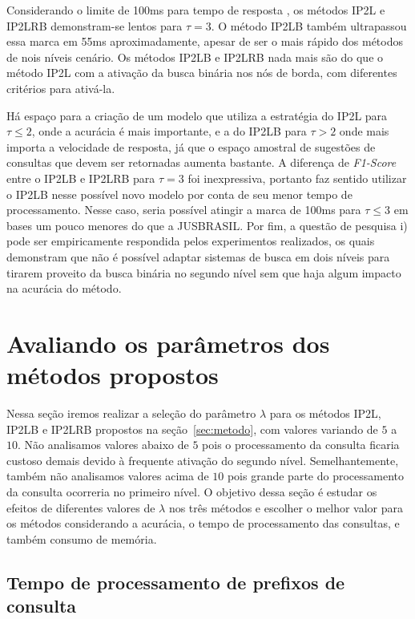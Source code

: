 Considerando o limite de 100ms para tempo de resposta \citep{ji2009efficient}, os métodos IP2L e IP2LRB demonstram-se lentos para $\tau=3$. O método IP2LB também ultrapassou essa marca em 55ms aproximadamente, apesar de ser o mais rápido dos métodos de nois níveis cenário. Os métodos IP2LB e IP2LRB nada mais são do que o método IP2L com a ativação da busca binária nos nós de borda, com diferentes critérios para ativá-la. 

Há espaço para a criação de um modelo que utiliza a estratégia do IP2L para $\tau \leq 2$, onde a acurácia é mais importante, e a do IP2LB para $\tau > 2$ onde mais importa a velocidade de resposta, já que o espaço amostral de sugestões de consultas que devem ser retornadas aumenta bastante. A diferença de \textit{F1-Score} entre o IP2LB e IP2LRB para $\tau=3$ foi inexpressiva, portanto faz sentido utilizar o IP2LB nesse possível novo modelo por conta de seu menor tempo de processamento. Nesse caso, seria possível atingir a marca de 100ms para $\tau \leq 3$ em bases um pouco menores do que a JUSBRASIL. Por fim, a questão de pesquisa i) pode ser empiricamente respondida pelos experimentos realizados, os quais demonstram que não é possível adaptar sistemas de busca em dois níveis para tirarem proveito da busca binária no segundo nível sem que haja algum impacto na acurácia do método.

\section{Avaliando os parâmetros dos métodos propostos}

Nessa seção iremos realizar a seleção do parâmetro $\lambda$ para os métodos IP2L, IP2LB e IP2LRB propostos na seção~\ref{sec:metodo}, com valores variando de $5$ a $10$. Não analisamos valores abaixo de $5$ pois o processamento da consulta ficaria custoso demais devido à frequente ativação do segundo nível. Semelhantemente, também não analisamos valores acima de $10$ pois grande parte do processamento da consulta ocorreria no primeiro nível. O objetivo dessa seção é estudar os efeitos de diferentes valores de $\lambda$ nos três métodos e escolher o melhor valor para os métodos considerando a acurácia, o tempo de processamento das consultas, e também consumo de memória.


\subsection{Tempo de processamento de prefixos de consulta}
\label{sec:methods-processing-time}

